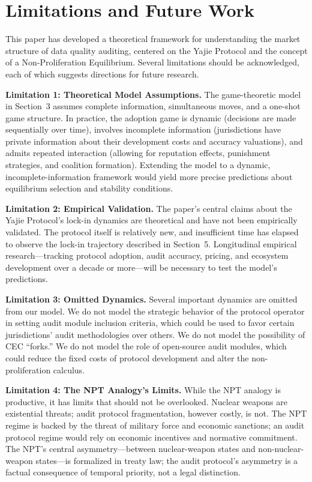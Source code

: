 \documentclass[12pt,a4paper]{article}
\theoremstyle{definition}
\theoremstyle{remark}
\begin{document}
\section{Limitations and Future Work}

This paper has developed a theoretical framework for understanding the market structure of data quality auditing, centered on the Yajie Protocol and the concept of a Non-Proliferation Equilibrium. Several limitations should be acknowledged, each of which suggests directions for future research.

\textbf{Limitation 1: Theoretical Model Assumptions.} The game-theoretic model in Section~3 assumes complete information, simultaneous moves, and a one-shot game structure. In practice, the adoption game is dynamic (decisions are made sequentially over time), involves incomplete information (jurisdictions have private information about their development costs and accuracy valuations), and admits repeated interaction (allowing for reputation effects, punishment strategies, and coalition formation). Extending the model to a dynamic, incomplete-information framework would yield more precise predictions about equilibrium selection and stability conditions.

\textbf{Limitation 2: Empirical Validation.} The paper's central claims about the Yajie Protocol's lock-in dynamics are theoretical and have not been empirically validated. The protocol itself is relatively new, and insufficient time has elapsed to observe the lock-in trajectory described in Section~5. Longitudinal empirical research—tracking protocol adoption, audit accuracy, pricing, and ecosystem development over a decade or more—will be necessary to test the model's predictions.

\textbf{Limitation 3: Omitted Dynamics.} Several important dynamics are omitted from our model. We do not model the strategic behavior of the protocol operator in setting audit module inclusion criteria, which could be used to favor certain jurisdictions' audit methodologies over others. We do not model the possibility of CEC ``forks.'' We do not model the role of open-source audit modules, which could reduce the fixed costs of protocol development and alter the non-proliferation calculus.

\textbf{Limitation 4: The NPT Analogy's Limits.} While the NPT analogy is productive, it has limits that should not be overlooked. Nuclear weapons are existential threats; audit protocol fragmentation, however costly, is not. The NPT regime is backed by the threat of military force and economic sanctions; an audit protocol regime would rely on economic incentives and normative commitment. The NPT's central asymmetry—between nuclear-weapon states and non-nuclear-weapon states—is formalized in treaty law; the audit protocol's asymmetry is a factual consequence of temporal priority, not a legal distinction.
\end{document}

